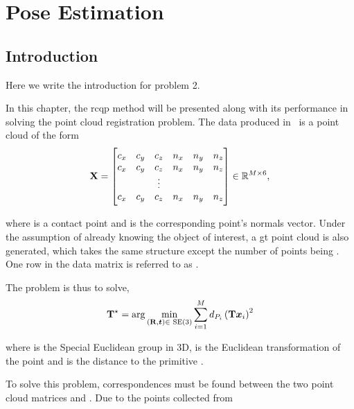 \chapter{Pose Estimation} \label{ch:2-pose-estimation}

\section{Introduction} \label{sec:2-pose-estimation-introduction}
Here we write the introduction for problem 2.

In this chapter, the \gls{rcqp} method will be presented along with its performance in solving the point cloud registration problem.
The data produced in~ is a point cloud of the form
\begin{equation} \label{eq:data-matrix-structure}
	\bm{\mathrm{X}} = 
	\begin{bmatrix}
		c_x & c_y & c_z & n_x & n_y & n_z \\
		c_x & c_y & c_z & n_x & n_y & n_z \\
		 &  & \vdots &  &  &  \\
		c_x & c_y & c_z & n_x & n_y & n_z \\
	\end{bmatrix}\in\mathbb{R}^{M\times 6},
\end{equation}

where  is a contact point and  is the corresponding point's normals vector. Under the assumption of already knowing the object of interest, a \gls{gt} point cloud  is also generated, which takes the same structure except the number of points being . One row in the data matrix  is referred to as .\medskip

The problem is thus to solve,
\begin{equation} \label{eq:point-cloud-registration-problem}
	\bm{\mathrm{T}}^\star = \arg \min_{(\bm{\mathrm{R}},\bm{t})\in\text{ SE} (3)} \sum^M_{i=1} d_{P_i}\left( \bm{\mathrm{T}} \bm{x}_i \right)^{2}
\end{equation}

where  is the Special Euclidean group in 3D,  is the Euclidean transformation of the point  and  is the distance to the primitive .

To solve this problem, correspondences must be found between the two point cloud matrices  and . Due to the points collected from 

